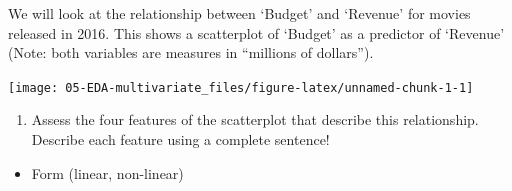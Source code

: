 \documentclass[
]{report}
\newenvironment{Shaded}{\begin{snugshade}}{\end{snugshade}}
\newcommand{\CommentTok}[1]{\textcolor[rgb]{0.56,0.35,0.01}{\textit{#1}}}
\newcommand{\DataTypeTok}[1]{\textcolor[rgb]{0.13,0.29,0.53}{#1}}
\newcommand{\KeywordTok}[1]{\textcolor[rgb]{0.13,0.29,0.53}{\textbf{#1}}}
\newcommand{\NormalTok}[1]{#1}
\newcommand{\OperatorTok}[1]{\textcolor[rgb]{0.81,0.36,0.00}{\textbf{#1}}}
\newcommand{\OtherTok}[1]{\textcolor[rgb]{0.56,0.35,0.01}{#1}}
\newcommand{\StringTok}[1]{\textcolor[rgb]{0.31,0.60,0.02}{#1}}
\providecommand{\tightlist}{%
  \setlength{\itemsep}{0pt}\setlength{\parskip}{0pt}}
\begin{document}
We will look at the relationship between `Budget' and `Revenue' for movies released in 2016. This shows a scatterplot of `Budget' as a predictor of `Revenue' (Note: both variables are measures in ``millions of dollars'').

\begin{Shaded}
\end{Shaded}

\begin{center}\texttt{[image: 05-EDA-multivariate\_files/figure-latex/unnamed-chunk-1-1]} \end{center}

\begin{enumerate}
\def\labelenumi{\arabic{enumi}.}
\setcounter{enumi}{2}
\tightlist
\item
  Assess the four features of the scatterplot that describe this relationship. Describe each feature using a complete sentence!
\end{enumerate}

\begin{itemize}
\tightlist
\item
  Form (linear, non-linear)
\end{itemize}

\vspace{.4in}
\end{document}
